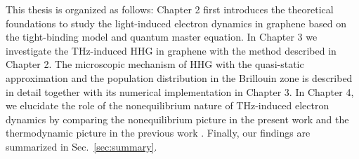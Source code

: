 This thesis is organized as follows: Chapter 2 first introduces the theoretical foundations to study the light-induced electron dynamics in graphene based on the tight-binding model and quantum master equation. In Chapter 3 we investigate the THz-induced HHG in graphene with the method described in Chapter 2. The microscopic mechanism of HHG with the quasi-static approximation and the population distribution in the Brillouin zone is described in detail together with its numerical implementation in Chapter 3. In Chapter 4, we elucidate the role of the nonequilibrium nature of THz-induced electron dynamics by comparing the nonequilibrium picture in the present work and the thermodynamic picture in the previous work \cite{mics2015thermodynamic}. Finally, our findings are summarized in Sec.~\ref{sec:summary}.
